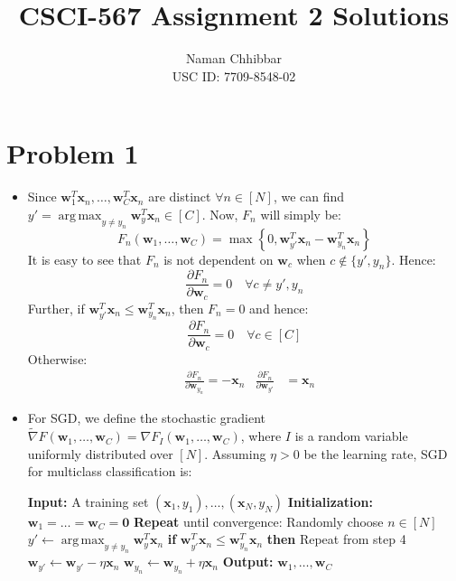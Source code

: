 \documentclass{article}
\title{CSCI-567 Assignment 2 Solutions}
\author{
  Naman Chhibbar \\
  USC ID: 7709-8548-02
}
\date{}
\newcommand{\mbi}[1]{\boldsymbol{#1}}
\newcommand{\IndentState}{\State \hspace{1em}}
\DeclareMathOperator*{\argmax}{arg\,max}
\begin{document}
\maketitle

\section{Problem 1}
  \begin{itemize}
    \item[\textbf{1.1}] Since $\mbi{w}_1^T \mbi{x}_n, \dots, \mbi{w}_C^T \mbi{x}_n$ are distinct $\forall n \in [N]$, we can find $y' = \argmax_{y \ne y_n} \mbi{w}_y^T \mbi{x}_n \in [C]$.
    Now, $F_n$ will simply be:
    \[ F_n(\mbi{w}_1, \dots, \mbi{w}_C) = \max\left\{ 0, \mbi{w}_{y'}^T \mbi{x}_n - \mbi{w}_{y_n}^T \mbi{x}_n \right\} \]
    It is easy to see that $F_n$ is not dependent on $\mbi{w}_c$ when $c \notin \{y', y_n\}$.
    Hence:
    \[ \frac{\partial F_n}{\partial \mbi{w}_c} = 0 \quad \forall c \ne y', y_n \]
    Further, if $\mbi{w}_{y'}^T \mbi{x}_n \le \mbi{w}_{y_n}^T \mbi{x}_n$, then $F_n = 0$ and hence:
    \[ \frac{\partial F_n}{\partial \mbi{w}_c} = 0 \quad \forall c \in [C] \]
    Otherwise:
    \begin{align*}
      &\frac{\partial F_n}{\partial \mbi{w}_{y_n}} = -\mbi{x}_n &\frac{\partial F_n}{\partial \mbi{w}_{y'}} &= \mbi{x}_n
    \end{align*}

    \item[\textbf{1.2}] For SGD, we define the stochastic gradient $\tilde{\nabla} F(\mbi{w}_1, \dots, \mbi{w}_C) = \nabla F_I(\mbi{w}_1, \dots, \mbi{w}_C)$, where $I$ is a random variable uniformly distributed over $[N]$.
    Assuming $\eta > 0$ be the learning rate, SGD for multiclass classification is:
    \begin{algorithm}
      \caption{Multiclass Perceptron}
      \begin{algorithmic}[1]
        \State \textbf{Input:} A training set $(\mbi{x}_1, y_1), \dots, (\mbi{x}_N, y_N)$
        \State \textbf{Initialization:} $\mbi{w}_1 = \dots = \mbi{w}_C = \mbi{0}$
        \State \textbf{Repeat} until convergence:
        \IndentState Randomly choose $n \in [N]$
        \IndentState $y' \gets \argmax_{y \ne y_n} \mbi{w}_y^T \mbi{x}_n$
        \IndentState \textbf{if} $\mbi{w}_{y'}^T \mbi{x}_n \le \mbi{w}_{y_n}^T \mbi{x}_n$ \textbf{then} Repeat from step 4
        \IndentState $\mbi{w}_{y'} \gets \mbi{w}_{y'} - \eta \mbi{x}_n$
        \IndentState $\mbi{w}_{y_n} \gets \mbi{w}_{y_n} + \eta \mbi{x}_n$
        \State \textbf{Output:} $\mbi{w}_1, \dots, \mbi{w}_C$
      \end{algorithmic}
    \end{algorithm}


\end{itemize}
\end{document}
